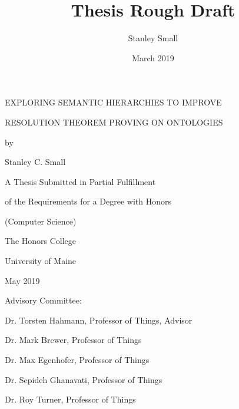 \documentclass{article}
\title{Thesis Rough Draft}
\author{Stanley Small}
\date{March 2019}
\begin{document}
\begin{titlepage}
\begin{spacing}{2}
    \begin{center}
        \MakeUppercase{Exploring Semantic Hierarchies to Improve}
        
        \MakeUppercase{Resolution Theorem Proving on Ontologies}
        
        \vspace{0.5cm}
        by
        
        \vspace{0.5cm}
        Stanley C. Small
        
        
        \vspace{4cm}
        A Thesis Submitted in Partial Fulfillment
        
        of the Requirements for a Degree with Honors
        
        (Computer Science)
        
        \vspace{3cm}
        
        The Honors College
        
        University of Maine

        May 2019
    \end{center}
    
    Advisory Committee:
    
    \hspace{10mm} Dr. Torsten Hahmann, Professor of Things, Advisor
    
    \hspace{10mm} Dr. Mark Brewer, Professor of Things
    
    \hspace{10mm} Dr. Max Egenhofer, Professor of Things
    
    \hspace{10mm} Dr. Sepideh Ghanavati, Professor of Things
    
    \hspace{10mm} Dr. Roy Turner, Professor of Things
    
    \end{spacing}
\end{titlepage}

\tableofcontents
\end{document}
